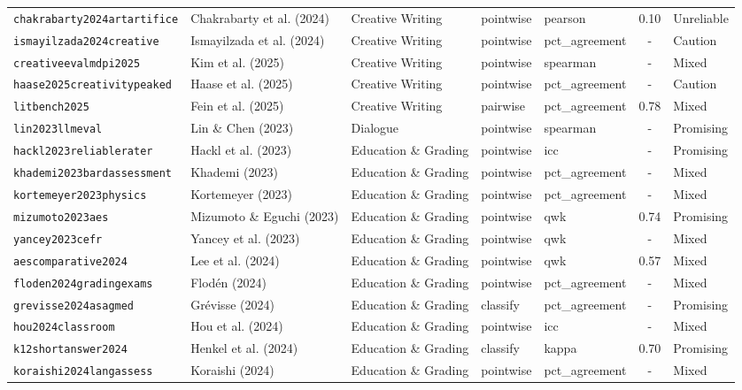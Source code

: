 \begin{longtable}{@{}l l l l l c l@{}}
\texttt{chakrabarty2024artartifice} & Chakrabarty et al. (2024) & Creative Writing & pointwise & pearson & 0.10 & Unreliable \\
\texttt{ismayilzada2024creative} & Ismayilzada et al. (2024) & Creative Writing & pointwise & pct\_agreement & - & Caution \\
\texttt{creativeevalmdpi2025} & Kim et al. (2025) & Creative Writing & pointwise & spearman & - & Mixed \\
\texttt{haase2025creativitypeaked} & Haase et al. (2025) & Creative Writing & pointwise & pct\_agreement & - & Caution \\
\texttt{litbench2025} & Fein et al. (2025) & Creative Writing & pairwise & pct\_agreement & 0.78 & Mixed \\
\texttt{lin2023llmeval} & Lin \& Chen (2023) & Dialogue & pointwise & spearman & - & Promising \\
\texttt{hackl2023reliablerater} & Hackl et al. (2023) & Education \& Grading & pointwise & icc & - & Promising \\
\texttt{khademi2023bardassessment} & Khademi (2023) & Education \& Grading & pointwise & pct\_agreement & - & Mixed \\
\texttt{kortemeyer2023physics} & Kortemeyer (2023) & Education \& Grading & pointwise & pct\_agreement & - & Mixed \\
\texttt{mizumoto2023aes} & Mizumoto \& Eguchi (2023) & Education \& Grading & pointwise & qwk & 0.74 & Promising \\
\texttt{yancey2023cefr} & Yancey et al. (2023) & Education \& Grading & pointwise & qwk & - & Mixed \\
\texttt{aescomparative2024} & Lee et al. (2024) & Education \& Grading & pointwise & qwk & 0.57 & Mixed \\
\texttt{floden2024gradingexams} & Flodén (2024) & Education \& Grading & pointwise & pct\_agreement & - & Mixed \\
\texttt{grevisse2024asagmed} & Grévisse (2024) & Education \& Grading & classify & pct\_agreement & - & Promising \\
\texttt{hou2024classroom} & Hou et al. (2024) & Education \& Grading & pointwise & icc & - & Mixed \\
\texttt{k12shortanswer2024} & Henkel et al. (2024) & Education \& Grading & classify & kappa & 0.70 & Promising \\
\texttt{koraishi2024langassess} & Koraishi (2024) & Education \& Grading & pointwise & pct\_agreement & - & Mixed \\

\end{longtable}
